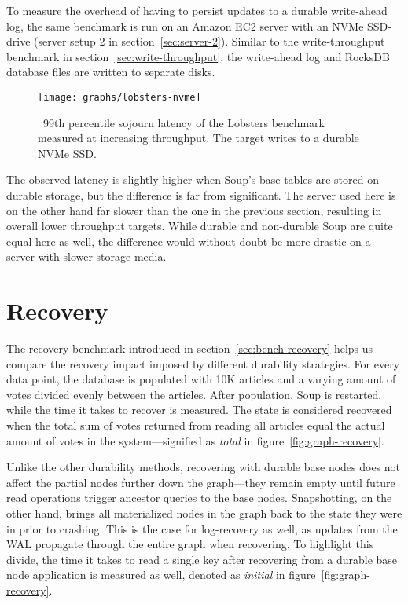 To measure the overhead of having to persist updates to a durable
write-ahead log, the same benchmark is run on an Amazon EC2 server with an NVMe
SSD-drive
(server setup 2 in section~\ref{sec:server-2}). Similar to the write-throughput
benchmark in section~\ref{sec:write-throughput}, the write-ahead log and RocksDB
database files are written to separate disks.

\begin{figure}[H]
  \texttt{[image: graphs/lobsters-nvme]}
  \caption{\
    99th percentile sojourn latency of the Lobsters benchmark measured at
    increasing throughput. The \code{rocksdb\_soup} target writes to a durable
    NVMe SSD.\@
  }\label{fig:lobsters-nvme}
\end{figure}

The observed latency is slightly higher when Soup's base tables are stored on
durable storage, but the difference is far from significant. The server used
here is on the other hand far slower than the one in the previous section,
resulting in overall lower throughput targets. While durable and non-durable
Soup are quite equal here as well, the difference would without doubt be more
drastic on a server with slower storage media.

\section{Recovery}

The recovery benchmark introduced in section~\ref{sec:bench-recovery} helps us
compare the recovery impact imposed by different durability strategies. For
every data point, the database is populated with 10K articles and a varying
amount of votes divided evenly between the articles. After population, Soup is
restarted, while the time it takes to recover is measured. The state is
considered recovered when the total sum of votes returned from reading all
articles equal the actual amount of votes in the system---signified as
\textit{total} in figure~\ref{fig:graph-recovery}.

Unlike the other durability methods, recovering with durable base nodes does not
affect the partial nodes further down the graph---they remain empty until future
read operations trigger ancestor queries to the base nodes. Snapshotting, on the
other hand, brings all materialized nodes in the graph back to the state they
were in prior to crashing. This is the case for log-recovery as well, as updates
from the WAL propagate through the entire graph when recovering. To highlight
this divide, the time it takes to read a single key after recovering from a
durable base node application is measured as well, denoted as \textit{initial}
in figure~\ref{fig:graph-recovery}.

